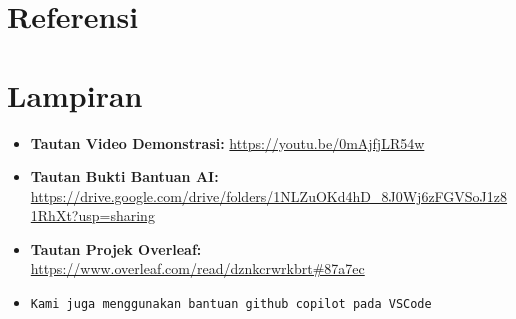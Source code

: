 \documentclass[11pt,a4paper]{article}
\begin{document}
\section{Referensi}
\renewcommand{\refname}{}



\newpage 
\appendix
\section{Lampiran} %

\begin{itemize}
    \item \textbf{Tautan Video Demonstrasi:} \url{https://youtu.be/0mAjfjLR54w}
\end{itemize}


\begin{itemize}
    \item \textbf{Tautan Bukti Bantuan AI:} \url{https://drive.google.com/drive/folders/1NLZuOKd4hD_8J0Wj6zFGVSoJ1z81RhXt?usp=sharing}
\end{itemize}

\begin{itemize}
    \item \textbf{Tautan Projek Overleaf:} \url{https://www.overleaf.com/read/dznkcrwrkbrt#87a7ec}
    \item\texttt{Kami juga menggunakan bantuan github copilot pada VSCode}
\end{itemize}
\end{document}
